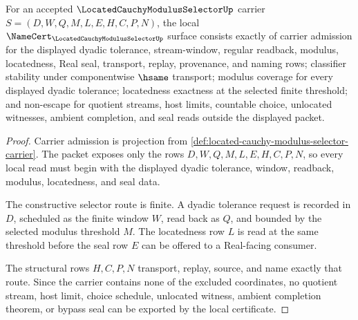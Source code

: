 \begin{theorem}
\label{thm:located-cauchy-modulus-selector-namecert-obligations}
For an accepted $\LocatedCauchyModulusSelectorUp$ carrier $S=(D,W,Q,M,L,E,H,C,P,N)$, the local $\NameCert_{\LocatedCauchyModulusSelectorUp}$ surface consists exactly of carrier admission for the displayed dyadic tolerance, stream-window, regular readback, modulus, locatedness, Real seal, transport, replay, provenance, and naming rows; classifier stability under componentwise $\hsame$ transport; modulus coverage for every displayed dyadic tolerance; locatedness exactness at the selected finite threshold; and non-escape for quotient streams, host limits, countable choice, unlocated witnesses, ambient completion, and seal reads outside the displayed packet.
\end{theorem}
\begin{proof}
Carrier admission is projection from \autoref{def:located-cauchy-modulus-selector-carrier}. The packet exposes only the rows $D,W,Q,M,L,E,H,C,P,N$, so every local read must begin with the displayed dyadic tolerance, window, readback, modulus, locatedness, and seal data.

The constructive selector route is finite. A dyadic tolerance request is recorded in $D$, scheduled as the finite window $W$, read back as $Q$, and bounded by the selected modulus threshold $M$. The locatedness row $L$ is read at the same threshold before the seal row $E$ can be offered to a Real-facing consumer.

The structural rows $H,C,P,N$ transport, replay, source, and name exactly that route. Since the carrier contains none of the excluded coordinates, no quotient stream, host limit, choice schedule, unlocated witness, ambient completion theorem, or bypass seal can be exported by the local certificate.
\end{proof}

